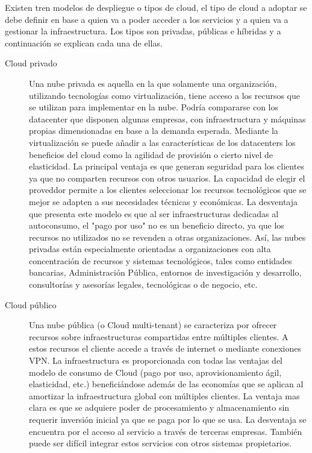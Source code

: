 Existen tren modelos de despliegue o tipos de cloud, el tipo de cloud a adoptar se debe definir en base a quien va a poder acceder a los servicios y a quien va a gestionar la infraestructura. Los tipos son privadas, públicas e híbridas y a continuación se explican cada una de ellas.

\begin{description}
\item[Cloud privado] Una nube privada es aquella en la que solamente una organización, utilizando tecnologías como virtualización, tiene acceso a los recursos que se utilizan para implementar en la nube. Podría compararse con los datacenter que disponen algunas empresas, con infraestructura y máquinas propias dimensionadas en base a la demanda esperada. Mediante la virtualización se puede añadir a las características de los datacenters los beneficios del cloud como la agilidad de provisión o cierto nivel de elasticidad. 
La principal ventaja es que generan seguridad para los clientes ya que no comparten recursos con otros usuarios. La capacidad de elegir el proveddor permite a los clientes seleccionar los recursos tecnológicos que se mejor se adapten a sus necesidades técnicas y económicas.
La desventaja que presenta este modelo es que al ser infraestructuras dedicadas al autoconsumo, el "pago por uso" no es un beneficio directo, ya que los recursos no utilizados no se revenden a otras organizaciones. 
Así, las nubes privadas están especialmente orientadas a organizaciones con alta concentración de recursos y sistemas tecnológicos, tales como entidades bancarias, Administración Pública, entornos de investigación y desarrollo, consultorías y asesorías legales, tecnológicas o de negocio, etc.

\item[Cloud público]
Una nube pública (o Cloud multi-tenant) se caracteriza por ofrecer recursos  sobre infraestructuras compartidas entre múltiples clientes. A estos recursos el cliente accede a través de internet o mediante conexiones VPN. La infraestructura es proporcionada con todas las ventajas del modelo de consumo de Cloud (pago por uso, aprovisionamiento ágil, elasticidad, etc.) beneficiándose además de las economías que se aplican al amortizar la infraestructura global con múltiples clientes.
La ventaja mas clara es que se adquiere poder de procesamiento y almacenamiento sin requerir inversión inicial ya que se paga por lo que se usa. La desventaja se encuentra por el acceso al servicio a través de terceras empresas. También puede ser difícil integrar estos servicios con otros sistemas propietarios.


\end{description}
